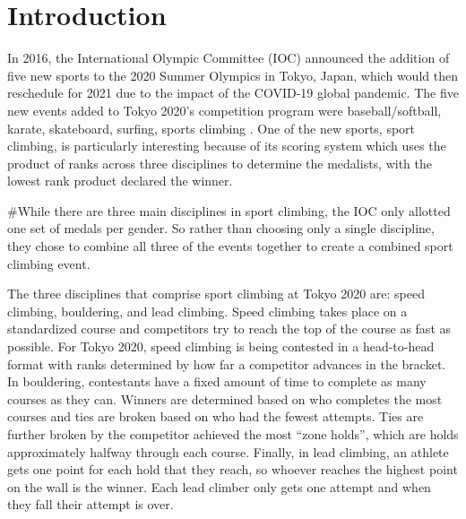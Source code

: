 \documentclass[12pt]{article}
\begin{document}
\hypertarget{introduction}{%
\section{Introduction}\label{introduction}}

In 2016, the International Olympic Committee (IOC) announced the
addition of five new sports to the 2020 Summer Olympics in Tokyo, Japan,
which would then reschedule for 2021 due to the impact of the COVID-19
global pandemic. The five new events added to Tokyo 2020's competition
program were baseball/softball, karate, skateboard, surfing, sports
climbing \citep{ioc2016}. One of the new sports, sport climbing, is
particularly interesting because of its scoring system which uses the
product of ranks across three disciplines to determine the medalists,
with the lowest rank product declared the winner.

\#While there are three main disciplines in sport climbing, the IOC only
allotted one set of medals per gender. So rather than choosing only a
single discipline, they chose to combine all three of the events
together to create a combined sport climbing event.

The three disciplines that comprise sport climbing at Tokyo 2020 are:
speed climbing, bouldering, and lead climbing. Speed climbing takes
place on a standardized course and competitors try to reach the top of
the course as fast as possible. For Tokyo 2020, speed climbing is being
contested in a head-to-head format with ranks determined by how far a
competitor advances in the bracket. In bouldering, contestants have a
fixed amount of time to complete as many courses as they can. Winners
are determined based on who completes the most courses and ties are
broken based on who had the fewest attempts. Ties are further broken by
the competitor achieved the most ``zone holds'', which are holds
approximately halfway through each course. Finally, in lead climbing, an
athlete gets one point for each hold that they reach, so whoever reaches
the highest point on the wall is the winner. Each lead climber only gets
one attempt and when they fall their attempt is over.
\end{document}
